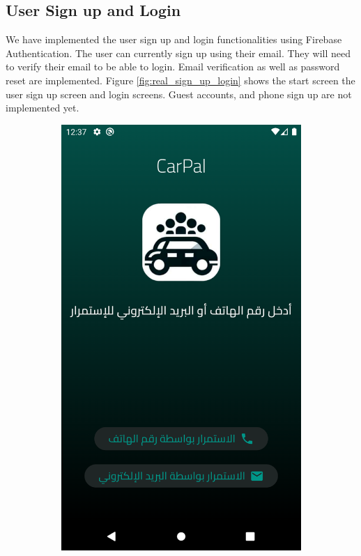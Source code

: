 \documentclass[a4paper, 12pt]{report} %
\begin{document}
        \pagebreak
        \subsection{User Sign up and Login}
            We have implemented the user sign up and login functionalities using Firebase Authentication. The user can currently sign up using their email. They will need to verify their email to be able to login. Email verification as well as password reset are implemented. Figure \ref{fig:real_sign_up_login} shows the start screen the user sign up screen and login screens. Guest accounts, and phone sign up are not implemented yet.
            \begin{figure}[H]
                \centering
                \begin{subfigure}{0.3\textwidth}
                    \includegraphics[width=0.8\linewidth, height=0.9\textheight, keepaspectratio]{Images/first_screen.png}

\end{subfigure}
\end{figure}
\end{document}
